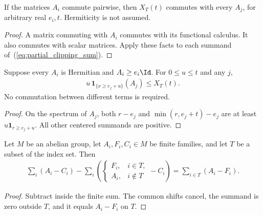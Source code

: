 \begin{theorem}
    \label{thm:partial_clipping_commutation}
    \leanok
    If the matrices $A_i$ commute pairwise, then $X_T(t)$ commutes with
    every $A_j$, for arbitrary real $e_i,t$. Hermiticity is not assumed.
\end{theorem}
\begin{proof}
    \leanok
    A matrix commuting with $A_i$ commutes with its functional calculus.
    It also commutes with scalar matrices. Apply these facts to each
    summand of~(\ref{eq:partial_clipping_sum}).
\end{proof}

\begin{theorem}
    \label{thm:partial_clipping_high_projection}
    \leanok
    Suppose every $A_i$ is Hermitian and $A_i\ge e_i\Id$. For $0\le u\le t$
    and any $j$,
    \begin{align}
        u\,\mathbf1_{\{x\ge e_j+u\}}(A_j)\le X_T(t).
        \label{eq:partial_clipping_high_bound}
    \end{align}
    No commutation between different terms is required.
\end{theorem}
\begin{proof}
    \leanok
    On the spectrum of $A_j$, both $r-e_j$ and $\min(r,e_j+t)-e_j$ are at
    least $u\mathbf1_{r\ge e_j+u}$. All other centered summands are positive.
\end{proof}

\begin{lemma}
    \label{lem:partial_replacement_difference}
    \leanok
    Let $M$ be an abelian group, let $A_i,F_i,C_i\in M$ be finite
    families, and let $T$ be a subset of the index set. Then
    \begin{align}
        \sum_i(A_i-C_i)
        -\sum_i\left(
          \begin{cases}F_i,&i\in T,\\A_i,&i\notin T\end{cases}-C_i\right)
        =\sum_{i\in T}(A_i-F_i).
    \end{align}
\end{lemma}
\begin{proof}\leanok
    Subtract inside the finite sum. The common shifts cancel, the
    summand is zero outside $T$, and it equals $A_i-F_i$ on $T$.
\end{proof}

